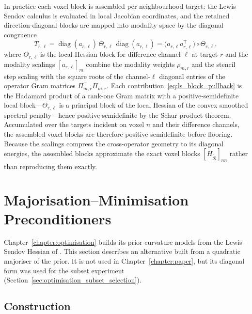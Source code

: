 In practice each voxel block is assembled per neighbourhood target: the Lewis--Sendov calculus is evaluated in local Jacobian coordinates, and the retained direction-diagonal blocks are mapped into modality space by the diagonal congruence
\begin{equation}
    T_{r,\ell}
    =
    \operatorname{diag}(a_{r,\ell})\,
    \Theta_{r,\ell}\,
    \operatorname{diag}(a_{r,\ell})
    =
    \bigl(a_{r,\ell}a_{r,\ell}^{\top}\bigr)\circ \Theta_{r,\ell},
    \label{eq:ls_block_pullback}
\end{equation}
where $\Theta_{r,\ell}$ is the local Hessian block for difference channel $\ell$ at target $r$ and the modality scalings $[a_{r,\ell}]_m$ combine the modality weights $\rho_{m,r}$ and the stencil step scaling with the square roots of the channel-$\ell$ diagonal entries of the operator Gram matrices $\Pi_{m,r}^{\top}\Pi_{m,r}$. Each contribution~\eqref{eq:ls_block_pullback} is the Hadamard product of a rank-one Gram matrix with a positive-semidefinite local block---$\Theta_{r,\ell}$ is a principal block of the local Hessian of the convex smoothed spectral penalty---hence positive semidefinite by the Schur product theorem. Accumulated over the targets incident on voxel $n$ and their difference channels, the assembled voxel blocks are therefore positive semidefinite before flooring. Because the scalings compress the cross-operator geometry to its diagonal energies, the assembled blocks approximate the exact voxel blocks $[H_{\widetilde{\mathcal R}}]_{nn}$ rather than reproducing them exactly.

\section{Majorisation--Minimisation Preconditioners}
\label{app:mm_preconditioner}

Chapter~\ref{chapter:optimisation} builds its prior-curvature models from the Lewis--Sendov Hessian of \wdtnv. This section describes an alternative built from a quadratic majoriser of the prior. It is not used in Chapter~\ref{chapter:paper}, but its diagonal form was used for the subset experiment (Section~\ref{sec:optimisation_subset_selection}).

\subsection{Construction}

